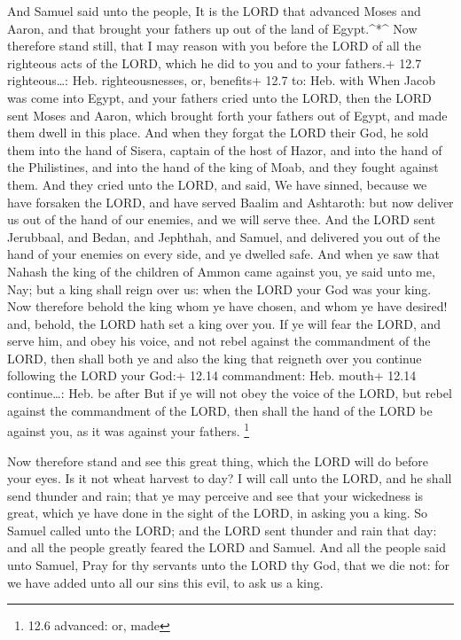  And Samuel said unto the people, It is the LORD that
advanced Moses and Aaron, and that brought your fathers up out of the
land of Egypt.\^{}*\^{}  Now therefore stand still, that I
may reason with you before the LORD of all the righteous acts of the
LORD, which he did to you and to your fathers.+ 12.7 righteous\ldots:
Heb. righteousnesses, or, benefits+ 12.7 to: Heb. with  When
Jacob was come into Egypt, and your fathers cried unto the LORD, then
the LORD sent Moses and Aaron, which brought forth your fathers out of
Egypt, and made them dwell in this place.  And when they
forgat the LORD their God, he sold them into the hand of Sisera, captain
of the host of Hazor, and into the hand of the Philistines, and into the
hand of the king of Moab, and they fought against them. 
And they cried unto the LORD, and said, We have sinned, because we have
forsaken the LORD, and have served Baalim and Ashtaroth: but now deliver
us out of the hand of our enemies, and we will serve thee. 
And the LORD sent Jerubbaal, and Bedan, and Jephthah, and Samuel, and
delivered you out of the hand of your enemies on every side, and ye
dwelled safe.  And when ye saw that Nahash the king of the
children of Ammon came against you, ye said unto me, Nay; but a king
shall reign over us: when the LORD your God was your king. 
Now therefore behold the king whom ye have chosen, and whom ye have
desired! and, behold, the LORD hath set a king over you. 
If ye will fear the LORD, and serve him, and obey his voice, and not
rebel against the commandment of the LORD, then shall both ye and also
the king that reigneth over you continue following the LORD your God:+
12.14 commandment: Heb. mouth+ 12.14 continue\ldots: Heb. be after
 But if ye will not obey the voice of the LORD, but rebel
against the commandment of the LORD, then shall the hand of the LORD be
against you, as it was against your fathers. \footnote{12.6 advanced:
  or, made}

 Now therefore stand and see this great thing, which the
LORD will do before your eyes.  Is it not wheat harvest to
day? I will call unto the LORD, and he shall send thunder and rain; that
ye may perceive and see that your wickedness is great, which ye have
done in the sight of the LORD, in asking you a king.  So
Samuel called unto the LORD; and the LORD sent thunder and rain that
day: and all the people greatly feared the LORD and Samuel.
 And all the people said unto Samuel, Pray for thy servants
unto the LORD thy God, that we die not: for we have added unto all our
sins this evil, to ask us a king.

